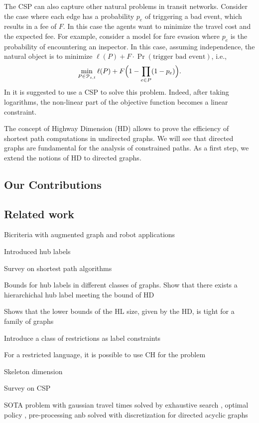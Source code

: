 The CSP can also capture other natural problems in transit networks.
Consider the case where each edge has a probability $p_e$ of triggering a bad event, which results in a fee of $F$.
In this case the agents want to minimize the travel cost and the expected fee.
For example, \citet{fareevasion} consider a model for fare evasion where $p_e$ is the probability of encountering an inspector.
In this case, assuming independence, the natural object is to minimize $\ell(P)+F\cdot\Pr(\text{trigger bad event})$, i.e.,
\[
\min_{P\in\mathcal{P}_{s,t}} \ell(P)+F\Bigl(1-\prod_{e\in P}(1-p_e)\Bigr).
\]
In \citep{fareevasion} it is suggested to use a CSP to solve this problem.
Indeed, after taking logarithms, the non-linear part of the objective function becomes a linear constraint.

The concept of Highway Dimension (HD) \cite{highway2010,highway2013} allows to prove the efficiency of shortest path computations in undirected graphs.
We will see that directed graphs are fundamental for the analysis of constrained paths.
As a first step, we extend the notions of HD to directed graphs.

\subsection{Our Contributions}


\subsection{Related work}

Bicriteria with augmented graph and robot applications \cite{alex_bicriteria}

Introduced hub labels\cite{cohen_definition_hl}

Survey on shortest path algorithms \cite{goldberg_survey}

Bounds for hub labels in different classes of graphs. 
Show that there exists a hierarchichal hub label meeting the bound of HD \cite{babenko_hl_complexity}

Shows that the lower bounds of the HL size, given by the HD, is tight for a family of graphs \cite{white_complexity_hd}

Introduce a class of restrictions as label constraints \cite{language_csp}

For a restricted language, it is possible to use CH for the problem \cite{rice_csp}

Skeleton dimension \cite{skeleton}

Survey on CSP \cite{csp_survey}

SOTA problem with gaussian travel times solved by exhaustive search \cite{nikolova_gaussian}, optimal policy \cite{samaranayake2012speedup}, pre-processing \cite{sabran2014precomputation} anb solved with discretization for directed acyclic graphs \cite{nikolova_discretization}